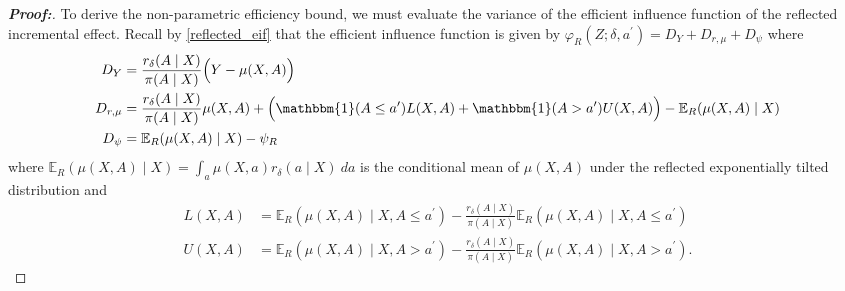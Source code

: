 \documentclass[11pt,twoside]{article}
\theoremstyle{definition}
\theoremstyle{remark}
\begin{document}
\begin{proof}[\textbf{Proof:}]
To derive the non-parametric efficiency bound, we must evaluate the variance of the efficient influence function of the reflected incremental effect. Recall by \cref{reflected_eif} that the efficient influence function is given by $\varphi_R(Z;\delta, a^\prime) = D_Y + D_{r, \mu} + D_\psi$ where
\begin{align*}
    D_Y &= \frac{r_\delta(A \mid X)}{\pi(A \mid X)} \Big(Y - \mu(X, A) \Big) \\
    D_{r, \mu} &= \frac{r_\delta(A \mid X)}{\pi(A \mid X)} \mu(X, A) + \Big(\mathbbm{1}(A \leq a^\prime)L(X, A) + \mathbbm{1}(A > a^\prime) U(X, A) \Big) - \mathbb{E}_R(\mu(X, A) \mid X) \\
    D_\psi &= \mathbb{E}_R(\mu(X, A) \mid X)  - \psi_R
\end{align*}
where $\mathbb{E}_R(\mu(X, A) \mid X) = \int_a \mu(X, a) r_\delta(a \mid X) \ da$ is the conditional mean of $\mu(X, A)$ under the reflected exponentially tilted distribution and
\begin{align*}
    L(X, A) &= \mathbb{E}_R(\mu(X, A) \mid X, A \leq a^\prime) - \frac{r_\delta(A \mid X)}{\pi(A \mid X)} \mathbb{E}_R(\mu(X, A) \mid X, A \leq a^\prime) \\
    U(X, A) &= \mathbb{E}_R(\mu(X, A) \mid X, A > a^\prime) - \frac{r_\delta(A \mid X)}{\pi(A \mid X)} \mathbb{E}_R(\mu(X, A) \mid X, A > a^\prime).
\end{align*}


\end{proof}
\end{document}
